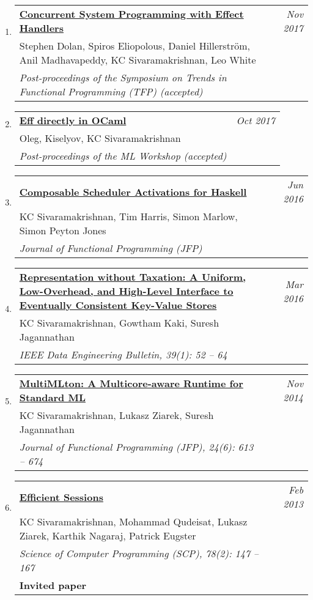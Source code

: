 \documentclass[10pt]{article}
\makeatletter
\newcommand{\lbar}[1]{{\color{#1}\ding{118}}\hspace*{2pt}}
\newenvironment{benumerate}[2]{
    \let\oldItem\item
    \def\item{\addtocounter{enumi}{-2}\oldItem}
    \begin{enumerate}[#2] \itemsep3pt
    \setcounter{enumi}{#1}
    \addtocounter{enumi}{1}}
  {\end{enumerate}}
\newenvironment{publication}[5]
{ \item
  \begin{tabular*}{7.5in}{p{6.3in}@{\extracolsep{\fill}}r}
    \href{#1}{\textbf{#2}} & \textit{#3}\\ #4 &\\ \textit{#5}&\\
  \end{tabular*}
} {}
\newenvironment{publicationNote}[6]
{ \item
  \begin{tabular*}{7.5in}{p{6.3in}@{\extracolsep{\fill}}r}
    \href{#1}{\textbf{#2}} & \textit{#3}\\ #4 &\\ \textit{#5}\\ \textbf{#6} \\
  \end{tabular*}
} {}
\newenvironment{region}[3]{%
  \vspace*{0.5ex}
  {\scalebox{1.4}{\textbf{#1}}}
  \begin{benumerate}{#3}{\color{RoyalBlue}#2}}
  {\end{benumerate}\vspace{0.8ex}}
\makeatother
\begin{document}
\begin{region} {\lbar{purple}Journal Publications}{{J}1}{6}

  \begin{publication}{http://kcsrk.info/papers/system_effects_may_17.pdf}
    {Concurrent System Programming with Effect Handlers}
    {Nov 2017}{Stephen Dolan, Spiros Eliopolous, Daniel Hillerström, Anil Madhavapeddy, KC Sivaramakrishnan, Leo White}
    {Post-proceedings of the Symposium on Trends in Functional Programming (TFP) (accepted)}
  \end{publication}

  \begin{publication}{http://kcsrk.info/papers/caml-eff17.pdf}
    {Eff directly in OCaml}
    {Oct 2017}{Oleg, Kiselyov, KC Sivaramakrishnan}
    {Post-proceedings of the ML Workshop (accepted)}
  \end{publication}

  \begin{publication}{http://kcsrk.info/papers/schedact_jfp15.pdf}
    {Composable Scheduler Activations for Haskell}
    {Jun 2016}{KC Sivaramakrishnan, Tim Harris, Simon Marlow, Simon Peyton Jones}
    {Journal of Functional Programming (JFP)}
  \end{publication}

  \begin{publication}{http://kcsrk.info/papers/quelea_ieee16.pdf}
    {Representation without Taxation: A Uniform, Low-Overhead, and High-Level Interface to Eventually Consistent Key-Value Stores}
    {Mar 2016}{KC Sivaramakrishnan, Gowtham Kaki, Suresh Jagannathan}
    {IEEE Data Engineering Bulletin, 39(1): 52 -- 64}
  \end{publication}

  \begin{publication} {http://kcsrk.info/papers/multimlton_jfp14.pdf}
    {MultiMLton: A Multicore-aware Runtime for Standard ML}
    {Nov 2014} {KC Sivaramakrishnan, Lukasz Ziarek, Suresh Jagannathan}
    {Journal of Functional Programming (JFP), 24(6): 613 -- 674}
  \end{publication}

  \begin{publicationNote}{http://kcsrk.info/papers/sting_scp13.pdf}{Efficient Sessions}
    {Feb 2013}{KC Sivaramakrishnan, Mohammad Qudeisat, Lukasz Ziarek, Karthik Nagaraj, Patrick Eugster}
    {Science of Computer Programming (SCP), 78(2): 147 -- 167}
    {Invited paper}
  \end{publicationNote}
\end{region}
\end{document}
